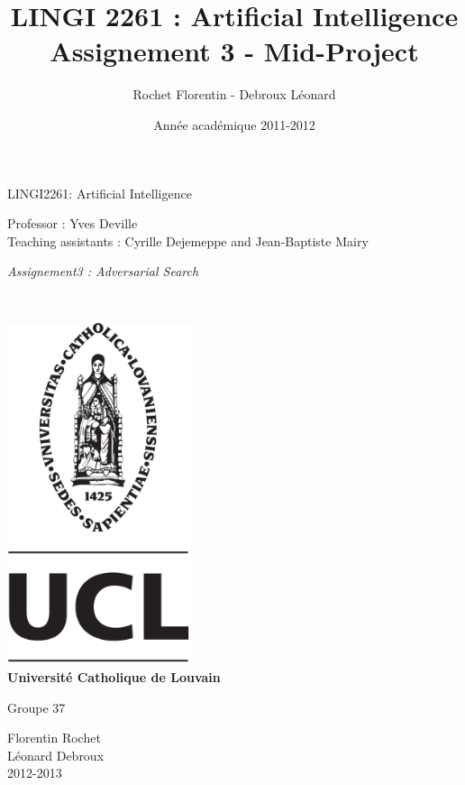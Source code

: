 \documentclass[a4paper,10pt]{article}
\title{LINGI 2261 : Artificial Intelligence \\
Assignement 3 - Mid-Project}
\author{Rochet Florentin - Debroux Léonard}
\date{Année académique 2011-2012}
\begin{document}
	\begin{titlepage}
		\begin{center}
			{\huge LINGI2261: Artificial Intelligence}\\
			\vspace{0.4cm}
			
			{\Large {Professor : Yves Deville\\ \vspace{0.2cm} Teaching assistants : Cyrille Dejemeppe and Jean-Baptiste Mairy  }}\\
			\vspace{0.6cm}
			
			{\Large \textit{ Assignement3 : Adversarial Search}}\\
			\vspace{1.2cm}

			\texttt{}\\
			\vspace{0.2cm}

			\includegraphics[height=10cm]{pageGarde.png}\\
			\vspace{0.1cm}
			{\Large \textbf{Universit\'e Catholique de Louvain}}
			\vspace{0.7cm}

			Groupe 37 \\
			\vspace{0.2cm}
			
			Florentin Rochet \\
			Léonard Debroux\\
			\vspace{0.2cm}
			2012-2013\\
		\end{center}
	\end{titlepage}
\end{document}
